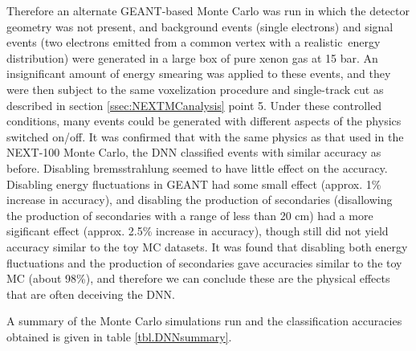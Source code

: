 \documentclass[a4paper,11pt]{article}
\begin{document}
Therefore an alternate GEANT-based Monte Carlo was run in which the detector geometry was not present, and background events (single electrons) and signal events (two electrons emitted
from a common vertex with a realistic \bbonu\,energy distribution) were generated in a large box of pure xenon gas at 15 bar.  An insignificant amount of energy smearing was applied to these
events, and they were then subject to the same voxelization procedure and single-track cut as described in section \ref{ssec:NEXTMCanalysis} point 5.  Under these controlled conditions, many 
events could be generated with different aspects of the physics switched on/off.  It was confirmed that with the same physics as that used in the NEXT-100 Monte Carlo, the DNN classified events 
with similar accuracy as before.  Disabling bremsstrahlung seemed to have little effect on the accuracy.  Disabling energy fluctuations in GEANT had some small effect (approx. 1\% increase in
accuracy), and disabling the production of secondaries (disallowing the production of secondaries with a range of less than 20 cm) had a more sigificant effect (approx. 2.5\% increase in accuracy),
though still did not yield accuracy similar to the toy MC datasets.  It was found that disabling both energy fluctuations and the production of secondaries gave accuracies similar to the toy MC
(about 98\%), and therefore we can conclude these are the physical effects that are often deceiving the DNN.

A summary of the Monte Carlo simulations run and the classification accuracies obtained is given in table \ref{tbl.DNNsummary}.  
\end{document}
